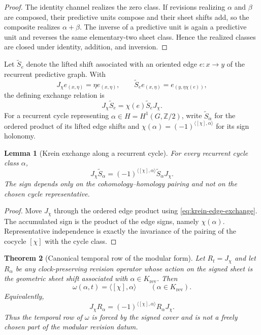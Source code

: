 \documentclass[11pt]{article}
\newtheorem{theorem}{Theorem}[section]
\newtheorem{lemma}[theorem]{Lemma}
\theoremstyle{definition}
\theoremstyle{remark}
\newcommand{\Ztwo}{\mathbb{Z}/2}
\begin{document}
\begin{proof}
The identity channel realizes the zero class.  If revisions realizing
\(\alpha\) and \(\beta\) are composed, their predictive units compose and their
sheet shifts add, so the composite realizes \(\alpha+\beta\).  The inverse of
a predictive unit is again a predictive unit and reverses the same
elementary-two sheet class.  Hence the realized classes are closed under
identity, addition, and inversion.
\end{proof}

Let $\widetilde S_e$ denote the lifted shift associated with an oriented
edge $e:x\to y$ of the recurrent predictive graph.  With
\[
 J_\chi e_{(x,\eta)}=\eta e_{(x,\eta)},\qquad
 \widetilde S_e e_{(x,\eta)}=e_{(y,\eta\chi(e))},
\]
the defining exchange relation is
\begin{equation}
 \label{eq:krein-edge-exchange}
 J_\chi\widetilde S_e=\chi(e)\widetilde S_eJ_\chi.
\end{equation}
For a recurrent cycle representing $\alpha\in H=H^1(G,\Ztwo)$, write
$\widetilde S_\alpha$ for the ordered product of its lifted edge shifts and
$\chi(\alpha)=(-1)^{\langle[\chi],\alpha\rangle}$ for its sign holonomy.

\begin{lemma}[Krein exchange along a recurrent cycle]
\label{lem:cycle-krein-exchange}
For every recurrent cycle class $\alpha$,
\[
 J_\chi\widetilde S_\alpha
 =(-1)^{\langle[\chi],\alpha\rangle}
  \widetilde S_\alpha J_\chi.
\]
The sign depends only on the cohomology--homology pairing and not on the chosen
cycle representative.
\end{lemma}

\begin{proof}
Move $J_\chi$ through the ordered edge product using
\eqref{eq:krein-edge-exchange}.  The accumulated sign is the product of the
edge signs, namely $\chi(\alpha)$.  Representative independence is exactly the
invariance of the pairing of the cocycle $[\chi]$ with the cycle class.
\end{proof}

\begin{theorem}[Canonical temporal row of the modular form]
\label{thm:canonical-temporal-row}
Let $R_t=J_\chi$ and let $R_\alpha$ be any clock-preserving revision operator
whose action on the signed sheet is the geometric sheet shift associated with
\(\alpha\in K_{\mathrm{rev}}\).  Then
\[
 \boxed{\ \omega(\alpha,t)=\langle[\chi],\alpha\rangle
 \qquad(\alpha\in K_{\mathrm{rev}}).\ }
\]
Equivalently,
\[
 J_\chi R_\alpha
 =(-1)^{\langle[\chi],\alpha\rangle}R_\alpha J_\chi.
\]
Thus the temporal row of $\omega$ is forced by the signed cover and is not a
freely chosen part of the modular revision datum.
\end{theorem}
\end{document}
